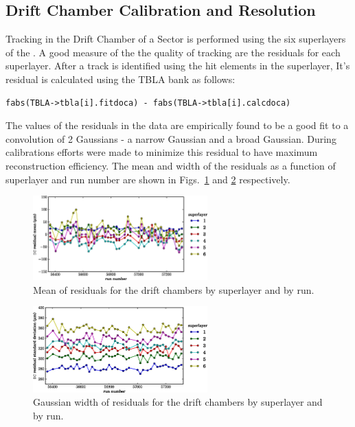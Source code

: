 \subsection{\label{sec:calib.dc}Drift Chamber Calibration and Resolution}

Tracking in the Drift Chamber of a  Sector is performed using the six superlayers of the . A good measure of the the quality of tracking are the  residuals for each superlayer. After a track is identified using the hit elements in the  superlayer, It's  residual is calculated using the TBLA bank as follows:

\begin{verbatim}
fabs(TBLA->tbla[i].fitdoca) - fabs(TBLA->tbla[i].calcdoca)
\end{verbatim}

The values of the  residuals in the  data are empirically found to be a good fit to a convolution of 2 Gaussians - a narrow Gaussian and a broad Gaussian. During  calibrations efforts were made to minimize this residual to have maximum reconstruction efficiency. The mean and width of the residuals as a function of superlayer and run number are shown in Figs.~\ref{fig:calib.dc.residuals.mean} and \ref{fig:calib.dc.residuals.wid} respectively.


\begin{figure}\begin{center}
\includegraphics[width=0.6\textwidth]{figures/calib/dc/dc_resid_mean.eps}
\caption[DC Residuals (Mean)]{\label{fig:calib.dc.residuals.mean}Mean of residuals for the drift chambers by superlayer and by run.}
\end{center}\end{figure}

\begin{figure}\begin{center}
\includegraphics[width=0.6\textwidth]{figures/calib/dc/dc_resid_sigma.eps}
\caption[DC Residuals (Width)]{\label{fig:calib.dc.residuals.wid}Gaussian width of residuals for the drift chambers by superlayer and by run.}
\end{center}\end{figure}

